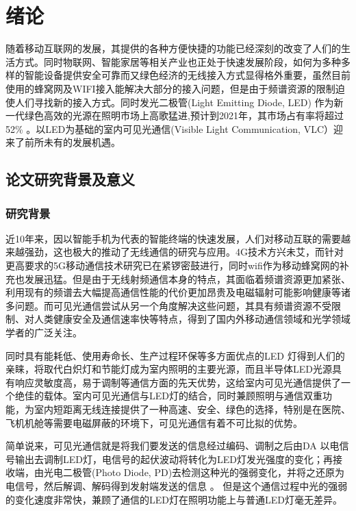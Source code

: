 
\chapter{绪论}\label{chap:introduction}
随着移动互联网的发展，其提供的各种方便快捷的功能已经深刻的改变了人们的生活方式。同时物联网、智能家居等相关产业也正处于快速发展阶段，如何为多种多样的智能设备提供安全可靠而又绿色经济的无线接入方式显得格外重要，虽然目前使用的蜂窝网及WIFI接入能解决大部分的接入问题，但是由于频谱资源的限制迫使人们寻找新的接入方式。同时发光二极管(Light Emitting Diode, LED) 作为新一代绿色高效的光源在照明市场上高歌猛进,预计到2021年，其市场占有率将超过52\%
\cite{陈特2013可见光通信的研究}。以LED为基础的室内可见光通信(Visible Light Communication, VLC）迎来了前所未有的发展机遇。

\section{论文研究背景及意义}\label{sec:background}
\subsection{研究背景}
近10年来，因以智能手机为代表的智能终端的快速发展，人们对移动互联的需要越来越强劲，这也极大的推动了无线通信的研究与应用。4G技术方兴未艾，而针对更高要求的5G移动通信技术研究已在紧锣密鼓进行，同时wifi作为移动蜂窝网的补充也发展迅猛。但是由于无线射频通信本身的特点，其面临着频谱资源更加紧张、利用现有的频谱去大幅提高通信性能的代价更加昂贵及电磁辐射可能影响健康等诸多问题。而可见光通信尝试从另一个角度解决这些问题，其具有频谱资源不受限制、对人类健康安全及通信速率快等特点，得到了国内外移动通信领域和光学领域学者的广泛关注。

同时具有能耗低、使用寿命长、生产过程环保等多方面优点的LED 灯得到人们的亲睐，将取代白炽灯和节能灯成为室内照明的主要光源，而且半导体LED光源具有响应灵敏度高，易于调制等通信方面的先天优势，这给室内可见光通信提供了一个绝佳的载体。室内可见光通信与LED灯的结合，同时兼顾照明与通信双重功能，为室内短距离无线连接提供了一种高速、安全、绿色的选择，特别是在医院、飞机机舱等需要电磁屏蔽的环境下，可见光通信有着不可比拟的优势。

简单说来，可见光通信就是将我们要发送的信息经过编码、调制之后由DA 以电信号输出去调制LED灯，电信号的起伏波动将转化为LED灯发光强度的变化；再接收端，由光电二极管(Photo Diode, PD)去检测这种光的强弱变化，并将之还原为电信号，然后解调、解码得到发射端发送的信息
\cite{tanaka2001indoor,fan2002effect,komine2003integrated,komine2004fundamental}。 但是这个通信过程中光的强弱的变化速度非常快，兼顾了通信的LED灯在照明功能上与普通LED灯毫无差异。


